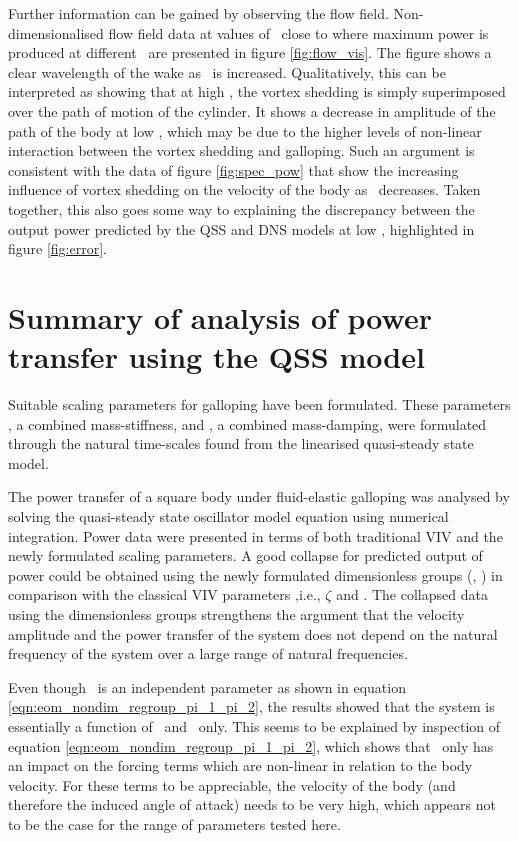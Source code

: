 

Further information can be gained by observing the flow field. Non-dimensionalised flow field data at values of \massdamp\ close to where maximum power is produced at different \massstiff\ are presented in figure \ref{fig:flow_vis}. The figure shows a clear wavelength of the wake as \massstiff \ is increased. Qualitatively, this can be interpreted as showing that at high \massstiff, the vortex shedding is simply superimposed over the path of motion of the cylinder. It shows a decrease in amplitude of the path of the body at low \massstiff, which may be due to the higher levels of non-linear interaction between the vortex shedding and galloping. Such an argument is consistent with the data of figure \ref{fig:spec_pow} that show the increasing influence of vortex shedding on the velocity of the body as \massstiff\ decreases. Taken together, this also goes some way to explaining the discrepancy between the output power predicted by the QSS and DNS models at low \massstiff, highlighted in figure \ref{fig:error}.


\section{Summary of analysis of power transfer using the QSS model}
\label{sec:summary-pi_1-pi_2}

Suitable scaling parameters for galloping have been formulated. These parameters \massstiff, a combined mass-stiffness, and \massdamp, a combined mass-damping, were formulated through the natural time-scales found from the linearised quasi-steady state model.   

The power transfer of a square body under fluid-elastic galloping was analysed by solving the quasi-steady state oscillator model equation using numerical  integration. Power data were presented in terms of both traditional VIV and the newly formulated scaling parameters. A good collapse for predicted output of power could be obtained using the newly formulated  dimensionless groups (\massstiff, \massdamp) in comparison with the classical VIV parameters ,i.e., $\zeta$ and \ustar. The collapsed data using the dimensionless groups strengthens the argument that the velocity amplitude and the power transfer of the system does not depend on the natural frequency of the system over a large range of natural frequencies.

Even though \mstar\ is an independent parameter as shown in equation \ref{eqn:eom_nondim_regroup_pi_1_pi_2}, the results showed that the system is essentially a function of \massstiff\ and \massdamp\ only.  This seems to be explained by inspection of  equation \ref{eqn:eom_nondim_regroup_pi_1_pi_2}, which shows that \mstar\ only has an impact on the forcing terms which are non-linear in relation to the body velocity. For these terms to be appreciable, the velocity of the body (and therefore the induced angle of attack) needs to be very high, which appears not to be the case for the range of parameters tested here. 


